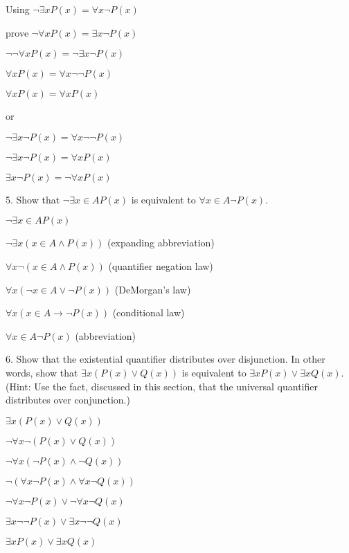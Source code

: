 \documentclass{article}
\begin{document}
Using $\neg \exists x P(x) =  \forall x \neg P(x)$

prove $\neg \forall x P(x) = \exists x \neg P(x)$

$\neg \neg \forall x P(x) = \neg \exists x \neg P(x)$

$\forall x P(x) = \forall x \neg \neg P(x)$

$\forall x P(x) = \forall x P(x)$

or

$\neg \exists x \neg P(x) =  \forall x \neg \neg P(x)$

$\neg \exists x \neg P(x) = \forall x P(x)$

$\exists x \neg P(x) = \neg \forall x P(x)$

\vspace{30pt}

5. Show that $\neg \exists x \in A P(x)$ is equivalent to $\forall x \in A \neg P(x)$.
\vspace{30pt}

$\neg \exists x \in A P(x)$

$\neg \exists x (x \in A \land P(x))$ (expanding abbreviation)

$\forall x \neg (x \in A \land P(x))$ (quantifier negation law)

$\forall x (\neg x \in A \lor \neg P(x))$ (DeMorgan's law)

$\forall x (x \in A \to \neg P(x))$ (conditional law)

$\forall x \in A \neg P(x)$ (abbreviation)

\vspace{30pt}

6. Show that the existential quantifier distributes over disjunction. In other
words, show that $\exists x (P(x) \lor Q(x))$ is equivalent to $\exists x P(x) \lor \exists x Q(x)$.
(Hint: Use the fact, discussed in this section, that the universal quantifier distributes over conjunction.)
\vspace{30pt}

$\exists x (P(x) \lor Q(x))$

$\neg \forall x \neg (P(x) \lor Q(x))$

$\neg \forall x (\neg P(x) \land \neg Q(x))$

$\neg (\forall x \neg P(x) \land \forall x \neg Q(x))$

$\neg \forall x \neg P(x) \lor \neg \forall x \neg Q(x)$

$\exists x \neg \neg P(x) \lor \exists x \neg \neg Q(x)$

$\exists x P(x) \lor \exists x Q(x)$
\end{document}

